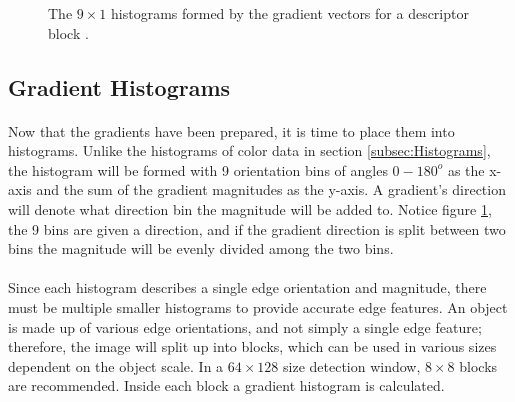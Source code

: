 \documentclass[11pt]{article}
\newcommand\simpleparagraph[1]{%
	\stepcounter{paragraph}\paragraph*{\theparagraph\quad{}#1}}
\renewcommand\theparagraph{}
\begin{document}
\begin{figure}
	\hfill
	\hfill
	\caption{The $9\times 1$ histograms formed by the gradient vectors for a descriptor block \cite{mallick_histogram_2016}.}
	\label{fig:HistrogramBins}
\end{figure}

\subsection{Gradient Histograms}
\simpleparagraph{}
Now that the gradients have been prepared, it is time to place them into histograms. Unlike the histograms of color data in section \ref{subsec:Histograms}, the histogram will be formed with 9 orientation bins of angles $0-180^{o}$ as the x-axis and the sum of the gradient magnitudes as the y-axis. A gradient's direction will denote what direction bin the magnitude will be added to. Notice figure \ref{fig:HistrogramBins}, the 9 bins are given a direction, and if the gradient direction is split between two bins the magnitude will be evenly divided among the two bins.
\simpleparagraph{}
Since each histogram describes a single edge orientation and magnitude, there must be multiple smaller histograms to provide accurate edge features. An object is made up of various edge orientations, and not simply a single edge feature; therefore, the image will split up into blocks, which can be used in various sizes dependent on the object scale. In a $64\times 128$ size detection window, $8\times 8$ blocks are recommended. Inside each block a gradient histogram is calculated.
\end{document}
